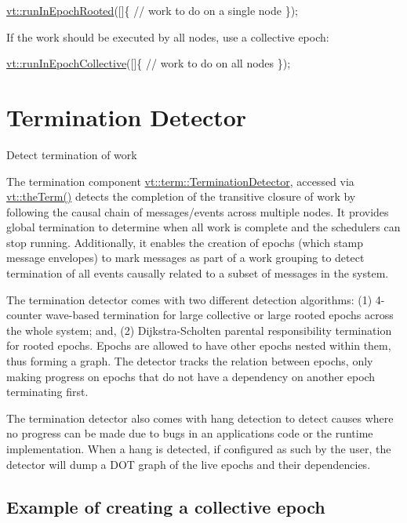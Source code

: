 \begin{DoxyCode}
\hyperlink{namespacevt_a9f5cbbc484d7f14f2ad0ee46d62dfb6e}{vt::runInEpochRooted}([]\{
  \textcolor{comment}{// work to do on a single node}
\});
\end{DoxyCode}


If the work should be executed by all nodes, use a collective epoch\+:


\begin{DoxyCode}
\hyperlink{namespacevt_a2fc4ef34f30b49a1781d765804bfadbb}{vt::runInEpochCollective}([]\{
  \textcolor{comment}{// work to do on all nodes}
\});
\end{DoxyCode}
 \hypertarget{term}{}\section{Termination Detector}\label{term}
Detect termination of work

The termination component {\ttfamily \hyperlink{structvt_1_1term_1_1_termination_detector}{vt\+::term\+::\+Termination\+Detector}}, accessed via {\ttfamily \hyperlink{namespacevt_a127580fdfcaba0b4171e5c48c5676733}{vt\+::the\+Term()}} detects the completion of the transitive closure of work by following the causal chain of messages/events across multiple nodes. It provides global termination to determine when all work is complete and the schedulers can stop running. Additionally, it enables the creation of epochs (which stamp message envelopes) to mark messages as part of a work grouping to detect termination of all events causally related to a subset of messages in the system.

The termination detector comes with two different detection algorithms\+: (1) 4-\/counter wave-\/based termination for large collective or large rooted epochs across the whole system; and, (2) Dijkstra-\/\+Scholten parental responsibility termination for rooted epochs. Epochs are allowed to have other epochs nested within them, thus forming a graph. The detector tracks the relation between epochs, only making progress on epochs that do not have a dependency on another epoch terminating first.

The termination detector also comes with hang detection to detect causes where no progress can be made due to bugs in an application\textquotesingle{}s code or the runtime implementation. When a hang is detected, if configured as such by the user, the detector will dump a D\+OT graph of the live epochs and their dependencies.\hypertarget{term_term-collective-example}{}\subsection{Example of creating a collective epoch}\label{term_term-collective-example}

